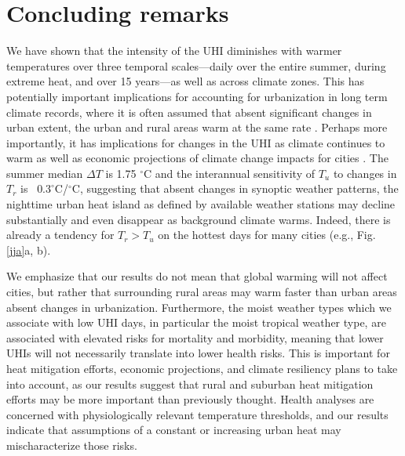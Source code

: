\documentclass[12pt]{iopart}
\begin{document}
{\section*{Concluding remarks}
We have shown that the intensity of the UHI diminishes with warmer temperatures over three temporal scales---daily over the entire summer, during extreme heat, and over 15 years---as well as across climate zones. 
This has potentially important implications for accounting for urbanization in long term climate records, where it is often assumed that absent significant changes in urban extent, the urban and rural areas warm at the same rate \cite{hausfather2013quantifying,stone2012managing}.  Perhaps more importantly, it has implications for changes in the UHI as climate continues to warm as well as economic projections of climate change impacts for cities \cite{estrada2017global}. The summer median $\Delta T$ is 1.75 $^\circ$C and the interannual sensitivity of $T_u$ to changes in $T_r$ is ~$0.3 ^\circ $C/$^\circ $C, suggesting that absent changes in synoptic weather patterns, the nighttime urban heat island as defined by available weather stations may decline substantially and even disappear as background climate warms. Indeed, there is already a tendency for $T_r > T_u$ on the hottest days for many cities (e.g., Fig. \ref{jja}a, b).

We emphasize that our results do not mean that global warming will not affect cities, but rather that surrounding rural areas may warm faster than urban areas absent changes in urbanization.
Furthermore, the moist weather types which we associate with low UHI days, in particular the moist tropical weather type, are associated with elevated risks for mortality and morbidity\cite{sheridan2004progress}, meaning that lower UHIs will not necessarily translate into lower health risks. 
This is important for heat mitigation efforts, economic projections, and climate resiliency plans to take into account, as our results suggest that rural and suburban heat mitigation efforts may be more important than previously thought. Health analyses are concerned with physiologically relevant temperature thresholds, and our results indicate that assumptions of a constant or increasing urban heat may mischaracterize those risks.   


}
\end{document}
